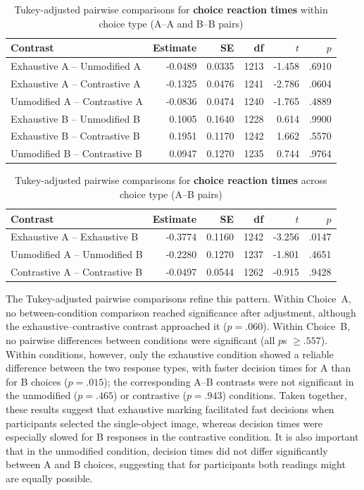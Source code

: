 \documentclass[ruler]{CUP-JNL-LIN}%
\begin{document}
\begin{table}[htbp]
\centering
\caption{Tukey-adjusted pairwise comparisons for \textbf{choice reaction times} within choice type (A--A and B--B pairs)}
\label{tab:choice-rt-pairwise-within-choice}
\begin{tabularx}{\textwidth}{@{}Xrrrrr@{}}
\toprule
Contrast & Estimate & SE & df & $t$ & $p$ \\
\midrule
Exhaustive A -- Unmodified A   & -0.0489 & 0.0335 & 1213 & -1.458 & .6910 \\
Exhaustive A -- Contrastive A  & -0.1325 & 0.0476 & 1241 & -2.786 & .0604 \\
Unmodified A -- Contrastive A  & -0.0836 & 0.0474 & 1240 & -1.765 & .4889 \\
Exhaustive B -- Unmodified B   &  0.1005 & 0.1640 & 1228 &  0.614 & .9900 \\
Exhaustive B -- Contrastive B  &  0.1951 & 0.1170 & 1242 &  1.662 & .5570 \\
Unmodified B -- Contrastive B  &  0.0947 & 0.1270 & 1235 &  0.744 & .9764 \\
\bottomrule
\end{tabularx}
\end{table}

\begin{table}[htbp]
\centering
\caption{Tukey-adjusted pairwise comparisons for \textbf{choice reaction times} across choice type (A--B pairs)}
\label{tab:choice-rt-pairwise-across-choice}
\begin{tabularx}{\textwidth}{@{}Xrrrrr@{}}
\toprule
Contrast & Estimate & SE & df & $t$ & $p$ \\
\midrule
Exhaustive A -- Exhaustive B   & -0.3774 & 0.1160 & 1242 & -3.256 & .0147 \\
Unmodified A -- Unmodified B   & -0.2280 & 0.1270 & 1237 & -1.801 & .4651 \\
Contrastive A -- Contrastive B & -0.0497 & 0.0544 & 1262 & -0.915 & .9428 \\
\bottomrule
\end{tabularx}
\end{table}

The Tukey-adjusted pairwise comparisons refine this pattern. Within Choice~A, no between-condition comparison reached significance after adjustment, although the exhaustive--contrastive contrast approached it ($p=.060$). Within Choice~B, no pairwise differences between conditions were significant (all $p$s $\ge .557$). 
Within conditions, however, only the exhaustive condition showed a reliable difference between the two response types, with faster decision times for A than for B choices ($p=.015$); the corresponding A--B contrasts were not significant in the unmodified ($p=.465$) or contrastive ($p=.943$) conditions. Taken together, these results suggest that exhaustive marking facilitated fast decisions when participants selected the single-object image, whereas decision times were especially slowed for B responses in the contrastive condition. It is also important that in the unmodified condition, decision times did not differ significantly between A and B choices, suggesting that for participants both readings might are equally possible.
\end{document}
